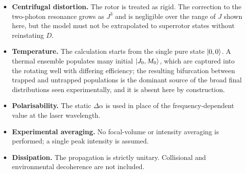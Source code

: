 \begin{itemize}
  \item \textbf{Centrifugal distortion.} The rotor is treated as rigid. The
        correction to the two-photon resonance grows as $J^{3}$ and is
        negligible over the range of $J$ shown here, but the model must not be
        extrapolated to superrotor states without reinstating $D$.
  \item \textbf{Temperature.} The calculation starts from the single pure
        state $\ket{0,0}$. A thermal ensemble populates many initial
        $\ket{J_0,M_0}$, which are captured into the rotating well with
        differing efficiency; the resulting bifurcation between trapped and
        untrapped populations is the dominant source of the broad final
        distributions seen experimentally, and it is absent here by
        construction.
  \item \textbf{Polarisability.} The static $\Delta\alpha$ is used in place of
        the frequency-dependent value at the laser wavelength.
  \item \textbf{Experimental averaging.} No focal-volume or intensity
        averaging is performed; a single peak intensity is assumed.
  \item \textbf{Dissipation.} The propagation is strictly unitary. Collisional
        and environmental decoherence are not included.
\end{itemize}